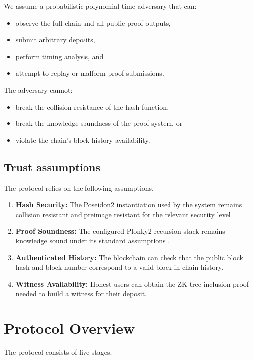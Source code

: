 \documentclass{iacrcc}
\begin{document}
We assume a probabilistic polynomial-time adversary that can:
\begin{itemize}[leftmargin=1.5em]
    \item observe the full chain and all public proof outputs,
    \item submit arbitrary deposits,
    \item perform timing analysis, and
    \item attempt to replay or malform proof submissions.
\end{itemize}
The adversary cannot:
\begin{itemize}[leftmargin=1.5em]
    \item break the collision resistance of the hash function,
    \item break the knowledge soundness of the proof system, or
    \item violate the chain's block-history availability.
\end{itemize}

\subsection{Trust assumptions}

The protocol relies on the following assumptions.
\begin{enumerate}[leftmargin=1.5em]
    \item \textbf{Hash Security:} The Poseidon2 instantiation used by the system remains collision resistant and preimage resistant for the relevant security level \cite{poseidon2}.
    \item \textbf{Proof Soundness:} The configured Plonky2 recursion stack remains knowledge sound under its standard assumptions \cite{plonky2,fri}.
    \item \textbf{Authenticated History:} The blockchain can check that the public block hash and block number correspond to a valid block in chain history.
    \item \textbf{Witness Availability:} Honest users can obtain the ZK tree inclusion proof needed to build a witness for their deposit.
\end{enumerate}

\section{Protocol Overview}
\label{sec:overview}

The protocol consists of five stages.
\end{document}
